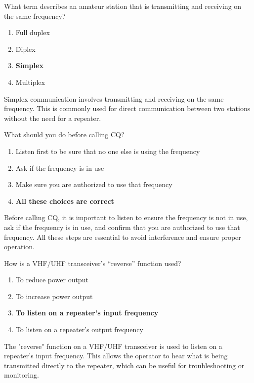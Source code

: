 \begin{tcolorbox}[colback=gray!10!white,colframe=black!75!black,title={T2A11}]
    What term describes an amateur station that is transmitting and receiving on the same frequency?
    \begin{enumerate}[label=\Alph*),noitemsep]
        \item Full duplex
        \item Diplex
        \item \textbf{Simplex}
        \item Multiplex
    \end{enumerate}
\end{tcolorbox}
Simplex communication involves transmitting and receiving on the same frequency. This is commonly used for direct communication between two stations without the need for a repeater.


\begin{tcolorbox}[colback=gray!10!white,colframe=black!75!black,title={T2A12}]
    What should you do before calling CQ?
    \begin{enumerate}[label=\Alph*),noitemsep]
        \item Listen first to be sure that no one else is using the frequency
        \item Ask if the frequency is in use
        \item Make sure you are authorized to use that frequency
        \item \textbf{All these choices are correct}
    \end{enumerate}
\end{tcolorbox}
Before calling CQ, it is important to listen to ensure the frequency is not in use, ask if the frequency is in use, and confirm that you are authorized to use that frequency. All these steps are essential to avoid interference and ensure proper operation.


\begin{tcolorbox}[colback=gray!10!white,colframe=black!75!black,title={T2B01}]
    How is a VHF/UHF transceiver’s “reverse” function used?
    \begin{enumerate}[label=\Alph*),noitemsep]
        \item To reduce power output
        \item To increase power output
        \item \textbf{To listen on a repeater’s input frequency}
        \item To listen on a repeater’s output frequency
    \end{enumerate}
\end{tcolorbox}
The "reverse" function on a VHF/UHF transceiver is used to listen on a repeater's input frequency. This allows the operator to hear what is being transmitted directly to the repeater, which can be useful for troubleshooting or monitoring.

